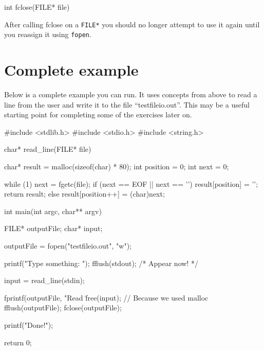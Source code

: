\begin{codeinline}
int fclose(FILE* file)
\end{codeinline}

After calling fclose on a \texttt{FILE*} you should no longer attempt to use it again until you reassign it using \texttt{fopen}.

\section{Complete example}

Below is a complete example you can run. 
It uses concepts from above to read a line from the user and write it to the file ``testfileio.out''.
This may be a useful starting point for completing some of the exercises later on.

\begin{codeblock}
#include <stdlib.h>
#include <stdio.h>
#include <string.h>

char* read_line(FILE* file)
{
    char* result = malloc(sizeof(char) * 80);
    int position = 0;
    int next = 0;

    while (1) {
        next = fgetc(file);
        if (next == EOF || next == '\n') {
            result[position] = '\0';
            return result;
        } else {
            result[position++] = (char)next;
        }
    }
}

int main(int argc, char** argv)
{
    FILE* outputFile;
    char* input;

    outputFile = fopen("testfileio.out", "w");

    printf("Type something: ");
    fflush(stdout); /* Appear now! */

    input = read_line(stdin);

    fprintf(outputFile, "Read \"%
    free(input); // Because we used malloc
    fflush(outputFile);
    fclose(outputFile);

    printf("Done!\n");

    return 0;
}
\end{codeblock}
